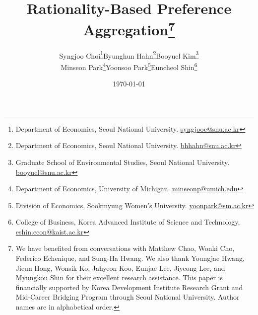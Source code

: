 \documentclass[11 pt]{article}
\begin{document}
\title{Rationality-Based Preference Aggregation\thanks{We have benefited from conversations with Matthew Chao, Wonki Cho, Federico Echenique, and Sung-Ha Hwang. We also thank Youngjae Hwang, Jieun Hong, Wonsik Ko, Jahyeon Koo, Eunjae Lee, Jiyeong Lee, and Myungkou Shin for their excellent research assistance. This paper is financially supported by Korea Development Institute Research Grant and Mid-Career Bridging Program through Seoul National University. Author names are in alphabetical order.} \\}

\author{
\begin{tabular}[t]{c@{\hskip 5em}c@{\hskip 5em}c}
 Syngjoo Choi\footnote{Department of Economics, Seoul National University. \href{mailto:syngjooc@snu.ac.kr}{syngjooc@snu.ac.kr}} &
 Byunghun Hahn\footnote{Department of Economics, Seoul National University. \href{mailto:bhhahn@snu.ac.kr}{bhhahn@snu.ac.kr}} &
 Booyuel Kim\footnote{Graduate School of Environmental Studies, Seoul National University. \href{mailto:booyuel@snu.ac.kr}{booyuel@snu.ac.kr}} \\[0.5em]
 Minseon Park\footnote{Department of Economics, University of Michigan. \href{mailto:minseonp@umich.edu}{minseonp@umich.edu}} &
 Yoonsoo Park\footnote{Division of Economics, Sookmyung Women's University. \href{mailto:yoonpark@sm.ac.kr}{yoonpark@sm.ac.kr}} &
 Euncheol Shin\footnote{College of Business, Korea Advanced Institute of Science and Technology, \href{mailto:eshin.econ@kaist.ac.kr}{eshin.econ@kaist.ac.kr}}
\end{tabular}
}


\date{
\today
}

\maketitle

\sloppy%

\onehalfspacing
\end{document}
